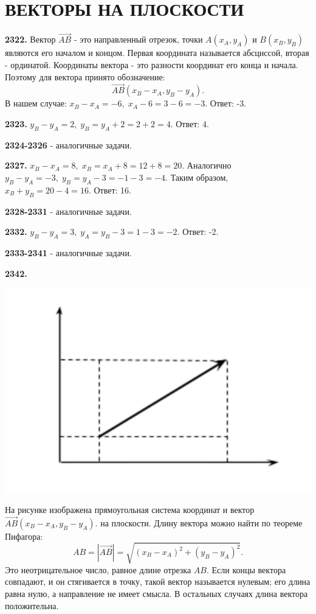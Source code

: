 \section{ВЕКТОРЫ НА ПЛОСКОСТИ}

\textbf{2322.} Вектор $\overrightarrow{AB}$ - это направленный отрезок, точки $A(x_A, y_A)$ и $B(x_B, y_B)$ являются его началом и концом. Первая координата называется абсциссой, вторая - ординатой. Координаты вектора - это разности координат его конца и начала. Поэтому для вектора принято обозначение:
\[
\overrightarrow{AB}(x_B-x_A, y_B-y_A).
\]
В нашем случае: $x_B-x_A=-6, \; x_A-6=3-6=-3.$ \newline \null \hspace*{\fill} Ответ: -3.

\textbf{2323.} $y_B-y_A=2, \; y_B=y_A+2=2+2=4.$ \newline \null \hspace*{\fill} Ответ: 4.

\textbf{2324-2326} - аналогичные задачи.

\textbf{2327.} $x_B-x_A=8, \;x_B=x_A+8=12+8=20$. Аналогично $y_B-y_A=-3, \; y_B=y_A-3=-1-3=-4.$ Таким образом, $x_B+y_B=20-4=16.$ \newline \null \hspace*{\fill} Ответ: 16.

\textbf{2328-2331} - аналогичные задачи.

\textbf{2332.} $y_B-y_A=3, \; y_A=y_B-3=1-3=-2.$ \newline \null \hspace*{\fill} Ответ: -2.

\textbf{2333-2341} - аналогичные задачи.

\textbf{2342.}

{\centering \includegraphics[width=0.5\linewidth]{Geometry/Content/54.png}
	
}

На рисунке изображена прямоугольная система координат и вектор $\overrightarrow{AB}(x_B-x_A, y_B-y_A)$. на плоскости. Длину вектора  можно найти по теореме Пифагора:
\[
AB=|\overrightarrow{AB}|=\sqrt{(x_B-x_A)^2+(y_B-y_A)^2}.
\]
Это неотрицательное число, равное длине отрезка $AB$. Если концы вектора совпадают,  и он стягивается в точку, такой вектор называется нулевым; его длина равна нулю, а направление не имеет смысла. В остальных случаях длина вектора положительна.

